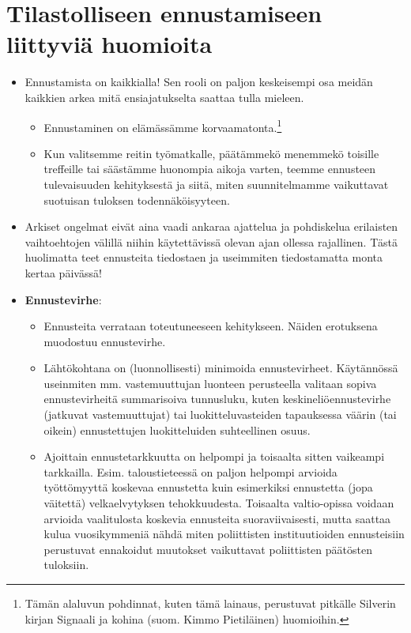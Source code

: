 \documentclass[
]{book}
\providecommand{\tightlist}{%
  \setlength{\itemsep}{0pt}\setlength{\parskip}{0pt}}
\begin{document}
\hypertarget{alaluku132}{%
\section{Tilastolliseen ennustamiseen liittyviä huomioita}\label{alaluku132}}

\begin{itemize}
\item
  Ennustamista on kaikkialla! Sen rooli on paljon keskeisempi osa meidän kaikkien arkea mitä ensiajatukselta saattaa tulla mieleen.

  \begin{itemize}
  \tightlist
  \item
    Ennustaminen on elämässämme korvaamatonta.\footnote{Tämän alaluvun pohdinnat, kuten tämä lainaus, perustuvat pitkälle Silverin kirjan Signaali ja kohina (suom. Kimmo Pietiläinen) huomioihin.}
  \item
    Kun valitsemme reitin työmatkalle, päätämmekö menemmekö toisille treffeille tai säästämme huonompia aikoja varten, teemme ennusteen tulevaisuuden kehityksestä ja siitä, miten suunnitelmamme vaikuttavat suotuisan tuloksen todennäköisyyteen.
  \end{itemize}
\item
  Arkiset ongelmat eivät aina vaadi ankaraa ajattelua ja pohdiskelua erilaisten vaihtoehtojen välillä niihin käytettävissä olevan ajan ollessa rajallinen. Tästä huolimatta teet ennusteita tiedostaen ja useimmiten tiedostamatta monta kertaa päivässä!
\item
  \textbf{Ennustevirhe}:

  \begin{itemize}
  \tightlist
  \item
    Ennusteita verrataan toteutuneeseen kehitykseen. Näiden erotuksena muodostuu ennustevirhe.
  \item
    Lähtökohtana on (luonnollisesti) minimoida ennustevirheet. Käytännössä useinmiten mm. vastemuuttujan luonteen perusteella valitaan sopiva ennustevirheitä summarisoiva tunnusluku, kuten keskineliöennustevirhe (jatkuvat vastemuuttujat) tai luokitteluvasteiden tapauksessa väärin (tai oikein) ennustettujen luokitteluiden suhteellinen osuus.
  \item
    Ajoittain ennustetarkkuutta on helpompi ja toisaalta sitten vaikeampi tarkkailla. Esim. taloustieteessä on paljon helpompi arvioida työttömyyttä koskevaa ennustetta kuin esimerkiksi ennustetta (jopa väitettä) velkaelvytyksen tehokkuudesta. Toisaalta valtio-opissa voidaan arvioida vaalitulosta koskevia ennusteita suoraviivaisesti, mutta saattaa kulua vuosikymmeniä nähdä miten poliittisten instituutioiden ennusteisiin perustuvat ennakoidut muutokset vaikuttavat poliittisten päätösten tuloksiin.
  \end{itemize}
\end{itemize}
\end{document}
